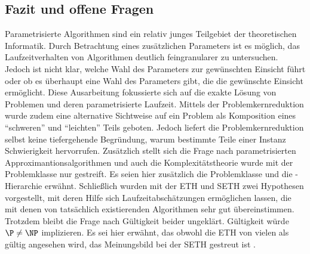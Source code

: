 \documentclass[a4paper,ngerman]{atseminar}
\begin{document}
\subsection{Fazit und offene Fragen}

Parametrisierte Algorithmen sind ein relativ junges Teilgebiet der theoretischen Informatik. Durch Betrachtung eines zusätzlichen
Parameters ist es möglich, das Laufzeitverhalten von Algorithmen deutlich feingranularer zu untersuchen. Jedoch ist nicht klar,
welche Wahl des Parameters zur gewünschten Einsicht führt oder ob es überhaupt eine Wahl des Parameters gibt, die die gewünschte Einsicht ermöglicht.
Diese Ausarbeitung fokussierte sich auf die exakte Lösung von Problemen und deren parametrisierte Laufzeit. Mittels der
Problemkernreduktion wurde zudem eine alternative Sichtweise auf ein Problem als Komposition eines \enquote{schweren} und \enquote{leichten} Teils
geboten. Jedoch liefert die Problemkernreduktion selbst keine tiefergehende Begründung, warum bestimmte Teile einer Instanz Schwierigkeit hervorrufen.
Zusätzlich stellt sich die Frage nach parametrisierten Approximantionsalgorithmen und auch die Komplexitätstheorie wurde mit der
Problemklasse \FPT\xspace nur gestreift. Es seien hier zusätzlich die Problemklasse \XP\xspace und die \W-Hierarchie erwähnt.
\noindent
Schließlich wurden mit der ETH und SETH zwei Hypothesen vorgestellt, mit deren Hilfe sich Laufzeitabschätzungen ermöglichen
lassen, die mit denen von tatsächlich existierenden Algorithmen sehr gut übereinstimmen. Trotzdem bleibt die Frage nach Gültigkeit beider ungeklärt. Gültigkeit würde $\P \neq \NP$ implizieren. Es sei hier
erwähnt, das obwohl die ETH von vielen als gültig angesehen wird, das Meinungsbild bei der SETH gestreut ist \cite{Parameterized,Beyond}.%








\end{document}
